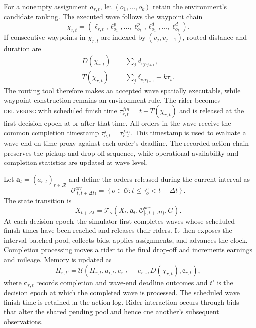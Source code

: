 \documentclass[letterpaper,journal]{IEEEtran}
\begin{document}
For a nonempty assignment $a_{r,t}$, let $(o_1,\ldots,o_k)$ retain the environment's candidate ranking. The executed wave follows the waypoint chain
\begin{equation}
\chi_{r,t}=\left(\ell_{r,t},\ell_{o_1}^{p},\ldots,
\ell_{o_k}^{p},\ell_{o_1}^{d},\ldots,\ell_{o_k}^{d}\right).
\end{equation}
If consecutive waypoints in $\chi_{r,t}$ are indexed by $(v_j,v_{j+1})$, routed distance and duration are
\begin{align}
D(\chi_{r,t})&=\sum_j d_{v_jv_{j+1}},\\
T(\chi_{r,t})&=\sum_j\delta_{v_jv_{j+1}}+k\tau_s.
\end{align}
The routing tool therefore makes an accepted wave spatially executable, while waypoint construction remains an environment rule. The rider becomes \textsc{delivering} with scheduled finish time $\tau_{r,t}^{fin}=t+T(\chi_{r,t})$ and is released at the first decision epoch at or after that time. All orders in the wave receive the common completion timestamp $\tau_{o,t}^{f}=\tau_{r,t}^{fin}$. This timestamp is used to evaluate a wave-end on-time proxy against each order's deadline. The recorded action chain preserves the pickup and drop-off sequence, while operational availability and completion statistics are updated at wave level.

Let $\mathbf a_t=(a_{r,t})_{r\in\mathcal{R}}$ and define the orders released during the current interval as
\begin{equation}
\mathcal{O}^{arr}_{[t,t+\Delta t)}=
\left\{o\in\mathcal{O}:t\leq\tau_o^c<t+\Delta t\right\}.
\end{equation}
The state transition is
\begin{equation}
X_{t+\Delta t}=\mathcal{T}_{\boldsymbol{\kappa}}
\left(X_t,\mathbf a_t,
\mathcal{O}^{arr}_{[t,t+\Delta t)},G\right).
\end{equation}
At each decision epoch, the simulator first completes waves whose scheduled finish times have been reached and releases their riders. It then exposes the interval-batched pool, collects bids, applies assignments, and advances the clock. Completion processing moves a rider to the final drop-off and increments earnings and mileage. Memory is updated as
\begin{equation}
H_{r,t'}=\mathcal{U}
\left(H_{r,t},a_{r,t},
e_{r,t'}-e_{r,t},D(\chi_{r,t}),\mathbf c_{r,t}\right),
\end{equation}
where $\mathbf c_{r,t}$ records completion and wave-end deadline outcomes and $t'$ is the decision epoch at which the completed wave is processed. The scheduled wave finish time is retained in the action log. Rider interaction occurs through bids that alter the shared pending pool and hence one another's subsequent observations.
\end{document}
